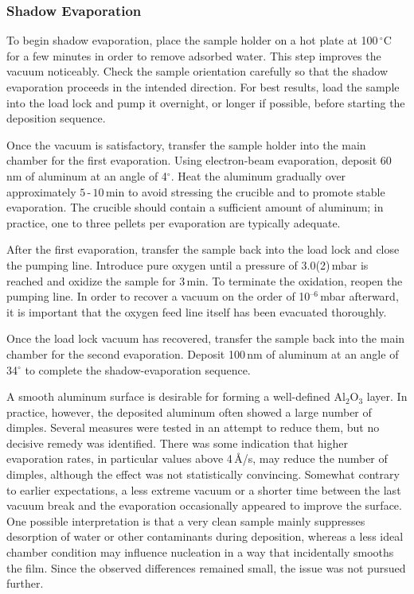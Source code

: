     \subsubsection*{Shadow Evaporation}
        To begin shadow evaporation, place the sample holder on a hot plate at 100\,$^\circ$C for a few minutes in order to remove adsorbed water. This step improves the vacuum noticeably. Check the sample orientation carefully so that the shadow evaporation proceeds in the intended direction. For best results, load the sample into the load lock and pump it overnight, or longer if possible, before starting the deposition sequence.

        Once the vacuum is satisfactory, transfer the sample holder into the main chamber for the first evaporation. Using electron-beam evaporation, deposit 60\,nm of aluminum at an angle of 4$^\circ$. Heat the aluminum gradually over approximately $5\,\text{-}\,10\,\mathrm{min}$ to avoid stressing the crucible and to promote stable evaporation. The crucible should contain a sufficient amount of aluminum; in practice, one to three pellets per evaporation are typically adequate.

        After the first evaporation, transfer the sample back into the load lock and close the pumping line. Introduce pure oxygen until a pressure of 3.0(2)\,mbar is reached and oxidize the sample for 3\,min. To terminate the oxidation, reopen the pumping line. In order to recover a vacuum on the order of 10$^\text{--6}$\,mbar afterward, it is important that the oxygen feed line itself has been evacuated thoroughly.

        Once the load lock vacuum has recovered, transfer the sample back into the main chamber for the second evaporation. Deposit 100\,nm of aluminum at an angle of 34$^\circ$ to complete the shadow-evaporation sequence.

        A smooth aluminum surface is desirable for forming a well-defined Al$_\text{2}$O$_\text{3}$ layer. In practice, however, the deposited aluminum often showed a large number of dimples. Several measures were tested in an attempt to reduce them, but no decisive remedy was identified. There was some indication that higher evaporation rates, in particular values above 4\,\AA/s, may reduce the number of dimples, although the effect was not statistically convincing. Somewhat contrary to earlier expectations, a less extreme vacuum or a shorter time between the last vacuum break and the evaporation occasionally appeared to improve the surface. One possible interpretation is that a very clean sample mainly suppresses desorption of water or other contaminants during deposition, whereas a less ideal chamber condition may influence nucleation in a way that incidentally smooths the film. Since the observed differences remained small, the issue was not pursued further.

